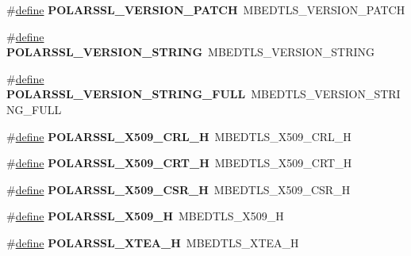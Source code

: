 \begin{DoxyCompactItemize}
\mbox{\label{compat-1_83_8h_aef722623c9ac01acf886d3517ad3d62a}} 
\#\hyperlink{structdefine}{define} {\bfseries P\+O\+L\+A\+R\+S\+S\+L\+\_\+\+V\+E\+R\+S\+I\+O\+N\+\_\+\+P\+A\+T\+CH}~M\+B\+E\+D\+T\+L\+S\+\_\+\+V\+E\+R\+S\+I\+O\+N\+\_\+\+P\+A\+T\+CH
\item 
\mbox{\label{compat-1_83_8h_aa460d4012331fc73ed6b324512b49b61}} 
\#\hyperlink{structdefine}{define} {\bfseries P\+O\+L\+A\+R\+S\+S\+L\+\_\+\+V\+E\+R\+S\+I\+O\+N\+\_\+\+S\+T\+R\+I\+NG}~M\+B\+E\+D\+T\+L\+S\+\_\+\+V\+E\+R\+S\+I\+O\+N\+\_\+\+S\+T\+R\+I\+NG
\item 
\mbox{\label{compat-1_83_8h_a17f8642e62f11a2a034a99c8a042f710}} 
\#\hyperlink{structdefine}{define} {\bfseries P\+O\+L\+A\+R\+S\+S\+L\+\_\+\+V\+E\+R\+S\+I\+O\+N\+\_\+\+S\+T\+R\+I\+N\+G\+\_\+\+F\+U\+LL}~M\+B\+E\+D\+T\+L\+S\+\_\+\+V\+E\+R\+S\+I\+O\+N\+\_\+\+S\+T\+R\+I\+N\+G\+\_\+\+F\+U\+LL
\item 
\mbox{\label{compat-1_83_8h_a5190ef194fd4a84c89cb501738fe73e5}} 
\#\hyperlink{structdefine}{define} {\bfseries P\+O\+L\+A\+R\+S\+S\+L\+\_\+\+X509\+\_\+\+C\+R\+L\+\_\+H}~M\+B\+E\+D\+T\+L\+S\+\_\+\+X509\+\_\+\+C\+R\+L\+\_\+H
\item 
\mbox{\label{compat-1_83_8h_a5b8abf4f52d91df56d9ded69190dfdba}} 
\#\hyperlink{structdefine}{define} {\bfseries P\+O\+L\+A\+R\+S\+S\+L\+\_\+\+X509\+\_\+\+C\+R\+T\+\_\+H}~M\+B\+E\+D\+T\+L\+S\+\_\+\+X509\+\_\+\+C\+R\+T\+\_\+H
\item 
\mbox{\label{compat-1_83_8h_a991cbfa69bc88785029b283b45ee984d}} 
\#\hyperlink{structdefine}{define} {\bfseries P\+O\+L\+A\+R\+S\+S\+L\+\_\+\+X509\+\_\+\+C\+S\+R\+\_\+H}~M\+B\+E\+D\+T\+L\+S\+\_\+\+X509\+\_\+\+C\+S\+R\+\_\+H
\item 
\mbox{\label{compat-1_83_8h_ab280b60777ba7e5b734cf02d59343c4e}} 
\#\hyperlink{structdefine}{define} {\bfseries P\+O\+L\+A\+R\+S\+S\+L\+\_\+\+X509\+\_\+H}~M\+B\+E\+D\+T\+L\+S\+\_\+\+X509\+\_\+H
\item 
\mbox{\label{compat-1_83_8h_ac070ed1f6a3d9970a508b1fef9d643fe}} 
\#\hyperlink{structdefine}{define} {\bfseries P\+O\+L\+A\+R\+S\+S\+L\+\_\+\+X\+T\+E\+A\+\_\+H}~M\+B\+E\+D\+T\+L\+S\+\_\+\+X\+T\+E\+A\+\_\+H

\end{DoxyCompactItemize}
